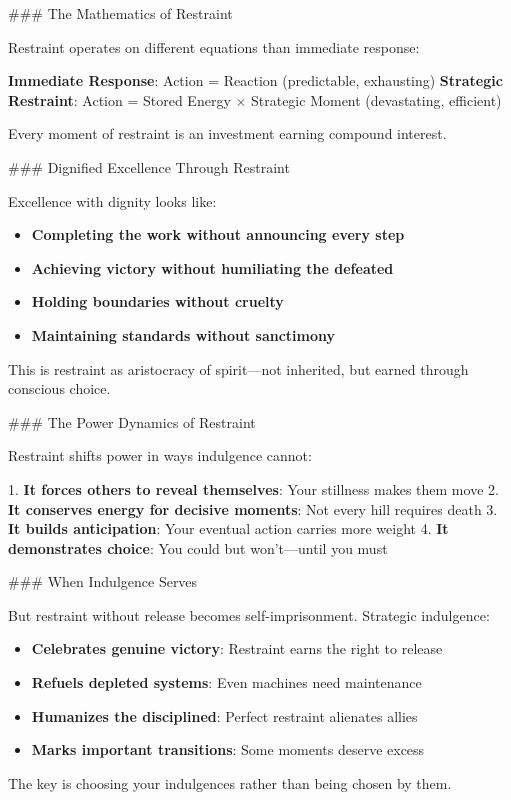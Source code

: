 \documentclass[12pt]{book}
\begin{document}
\#\#\# The Mathematics of Restraint

Restraint operates on different equations than immediate response:

\textbf{Immediate Response}: Action = Reaction (predictable, exhausting)
\textbf{Strategic Restraint}: Action = Stored Energy × Strategic Moment (devastating, efficient)

Every moment of restraint is an investment earning compound interest.

\#\#\# Dignified Excellence Through Restraint

Excellence with dignity looks like:

\begin{itemize}
\item \textbf{Completing the work without announcing every step}
\item \textbf{Achieving victory without humiliating the defeated}
\item \textbf{Holding boundaries without cruelty}
\item \textbf{Maintaining standards without sanctimony}

\end{itemize}
This is restraint as aristocracy of spirit—not inherited, but earned through conscious choice.

\#\#\# The Power Dynamics of Restraint

Restraint shifts power in ways indulgence cannot:

1. \textbf{It forces others to reveal themselves}: Your stillness makes them move
2. \textbf{It conserves energy for decisive moments}: Not every hill requires death
3. \textbf{It builds anticipation}: Your eventual action carries more weight
4. \textbf{It demonstrates choice}: You could but won't—until you must

\#\#\# When Indulgence Serves

But restraint without release becomes self-imprisonment. Strategic indulgence:

\begin{itemize}
\item \textbf{Celebrates genuine victory}: Restraint earns the right to release
\item \textbf{Refuels depleted systems}: Even machines need maintenance
\item \textbf{Humanizes the disciplined}: Perfect restraint alienates allies
\item \textbf{Marks important transitions}: Some moments deserve excess

\end{itemize}
The key is choosing your indulgences rather than being chosen by them.
\end{document}
